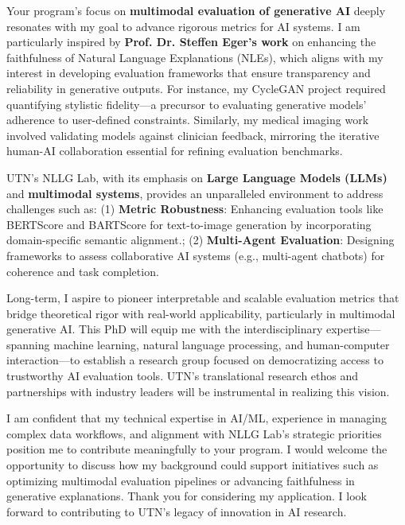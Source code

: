 \documentclass[11pt,a4paper, final]{moderncv}
\begin{document}
Your program's focus on \textbf{multimodal evaluation of generative AI} deeply resonates with my goal 
to advance rigorous metrics for AI systems. 
I am particularly inspired by \textbf{Prof. Dr. Steffen Eger's work} 
on enhancing the faithfulness of Natural Language Explanations (NLEs), 
which aligns with my interest in developing evaluation frameworks that ensure transparency and reliability in generative outputs. 
For instance, my CycleGAN project required quantifying stylistic fidelity—a precursor to evaluating generative models' adherence to user-defined constraints. 
Similarly, my medical imaging work involved validating models against clinician feedback, mirroring the iterative human-AI collaboration essential for refining evaluation benchmarks.

UTN's NLLG Lab, with its emphasis on \textbf{Large Language Models (LLMs)} and \textbf{multimodal systems}, 
provides an unparalleled environment to address challenges such as: 
(1) \textbf{Metric Robustness}: Enhancing evaluation tools like BERTScore and BARTScore for text-to-image generation by incorporating domain-specific semantic alignment.; 
(2) \textbf{Multi-Agent Evaluation}: Designing frameworks to assess collaborative AI systems (e.g., multi-agent chatbots) for coherence and task completion.

Long-term, I aspire to pioneer interpretable and scalable evaluation metrics that bridge theoretical rigor with real-world applicability, particularly in multimodal generative AI. 
This PhD will equip me with the interdisciplinary expertise—spanning machine learning, natural language processing, and human-computer interaction—to establish a research group focused on democratizing access to trustworthy AI evaluation tools. 
UTN's translational research ethos and partnerships with industry leaders will be instrumental in realizing this vision.

I am confident that my technical expertise in AI/ML, experience in managing complex data workflows, and alignment with NLLG Lab's strategic priorities position me to contribute meaningfully to your program. 
I would welcome the opportunity to discuss how my background could support initiatives such as optimizing multimodal evaluation pipelines or advancing faithfulness in generative explanations. 
Thank you for considering my application. 
I look forward to contributing to UTN's legacy of innovation in AI research.

\makeletterclosing
\end{document}
